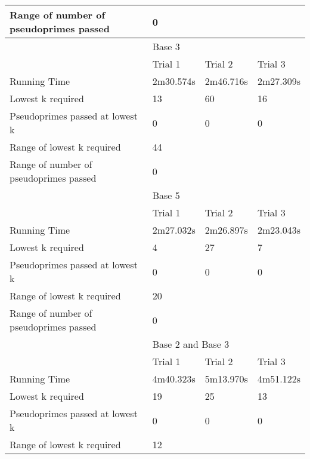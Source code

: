 \documentclass{article}
\begin{document}
\begin{appendices}
\begin{table}[h]
\begin{tabular}{@{}llll@{}}
Range of number of pseudoprimes passed & \multicolumn{3}{l}{0}                 \\\midrule
                                       & \multicolumn{3}{l}{Base 3}            \\\midrule
                                       & Trial 1     & Trial 2    & Trial 3    \\
Running Time                           & 2m30.574s   & 2m46.716s  & 2m27.309s  \\
Lowest k required                      & 13          & 60         & 16         \\
Pseudoprimes passed at lowest k        & 0           & 0          & 0          \\\cmidrule(lr){2-4}
Range of lowest k required             & \multicolumn{3}{l}{44}                \\
Range of number of pseudoprimes passed & \multicolumn{3}{l}{0}                 \\\midrule
                                       & \multicolumn{3}{l}{Base 5}            \\\midrule
                                       & Trial 1     & Trial 2    & Trial 3    \\
Running Time                           & 2m27.032s   & 2m26.897s  & 2m23.043s  \\
Lowest k required                      & 4           & 27         & 7          \\
Pseudoprimes passed at lowest k        & 0           & 0          & 0          \\\cmidrule(lr){2-4}
Range of lowest k required             & \multicolumn{3}{l}{20}                \\
Range of number of pseudoprimes passed & \multicolumn{3}{l}{0}                 \\\midrule
                                       & \multicolumn{3}{l}{Base 2 and Base 3} \\\midrule 
                                       & Trial 1     & Trial 2    & Trial 3    \\
Running Time                           & 4m40.323s   & 5m13.970s  & 4m51.122s  \\
Lowest k required                      & 19          & 25         & 13         \\
Pseudoprimes passed at lowest k        & 0           & 0          & 0          \\\cmidrule(lr){2-4}
Range of lowest k required             & \multicolumn{3}{l}{12}                \\

\end{tabular}
\end{table}
\end{appendices}
\end{document}

